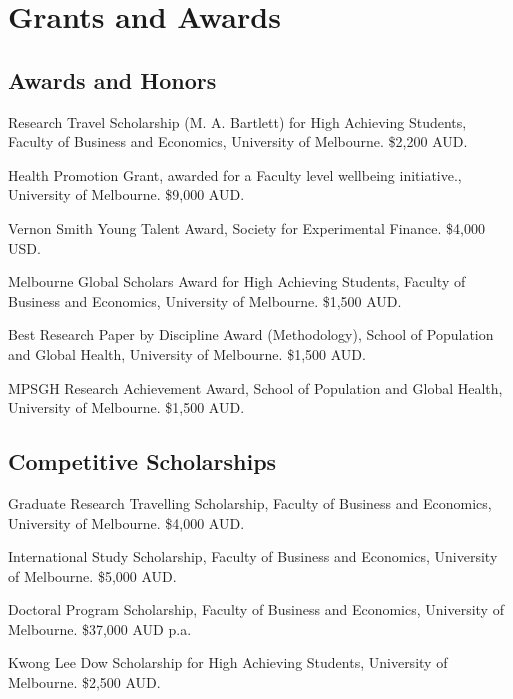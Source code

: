 \documentclass[11pt,letterpaper]{report}
\begin{document}
    \section*{Grants and Awards}

    \subsection*{Awards and Honors}

    \begin{tablist}
        \item[2026] \tab{}Research Travel Scholarship (M. A. Bartlett) for High Achieving Students, Faculty of Business and Economics, University of Melbourne. \$2,200 AUD.
        \item[2026] \tab{}Health Promotion Grant, awarded for a Faculty level wellbeing initiative., University of Melbourne. \$9,000 AUD.
        \item[2025] \tab{}Vernon Smith Young Talent Award, Society for Experimental Finance. \$4,000 USD.
        \item[2024] \tab{}Melbourne Global Scholars Award for High Achieving Students, Faculty of Business and Economics, University of Melbourne. \$1,500 AUD.
        \item[2023] \tab{}Best Research Paper by Discipline Award (Methodology), School of Population and Global Health, University of Melbourne. \$1,500 AUD.
        \item[2022] \tab{}MPSGH Research Achievement Award, School of Population and Global Health, University of Melbourne. \$1,500 AUD.
    \end{tablist}

    \subsection*{Competitive Scholarships}
    \begin{tablist}
        \item[2026] \tab{}Graduate Research Travelling Scholarship, Faculty of Business and Economics, University of Melbourne. \$4,000 AUD.
        \item[2024] \tab{}International Study Scholarship, Faculty of Business and Economics, University of Melbourne. \$5,000 AUD.
        \item[2023] \tab{}Doctoral Program Scholarship, Faculty of Business and Economics, University of Melbourne. \$37,000 AUD p.a.
        \item[2014] \tab{}Kwong Lee Dow Scholarship for High Achieving Students, University of Melbourne. \$2,500 AUD.
    \end{tablist}
\end{document}
